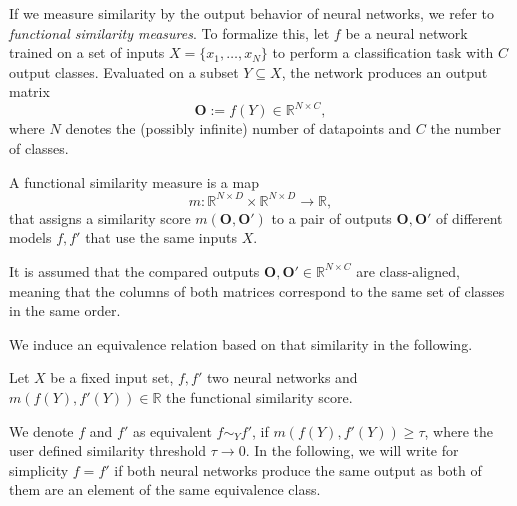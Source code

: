 If we measure similarity by the output behavior of neural networks, we refer to \emph{functional similarity measures}.
To formalize this, let \( f \) be a neural network trained on a set of inputs \( X = \{x_1, \ldots, x_N\} \) to perform a classification task with \( C \) output classes.
Evaluated on a subset \( Y \subseteq X \), the network produces an output matrix
\[
    \mathbf{O} := f(Y) \in \mathbb{R}^{N \times C},
\]
where \( N \) denotes the (possibly infinite) number of datapoints and \( C \) the number of classes.


\begin{definition}
A functional similarity measure is a map 
\begin{equation*}
    m: \mathbb{R}^{N\times D} \times \mathbb{R}^{N\times D} \longrightarrow \mathbb{R}, 
\end{equation*}
that assigns a similarity score $m(\mathbf{O}, \mathbf{O}')$ to a pair of outputs $\mathbf{O}, \mathbf{O}'$ of different models $f,f'$ that use the same inputs $X$. 

It is assumed that the compared outputs \( \mathbf{O}, \mathbf{O}' \in \mathbb{R}^{N \times C} \) are class-aligned, meaning that the columns of both matrices correspond to the same set of classes in the same order.
\end{definition}

We induce an equivalence relation based on that similarity in the following.

\begin{definition}
Let $X$ be a fixed input set, $f,f'$ two neural networks and $m(f(Y),f'(Y))\in \mathbb{R}$ the functional similarity score.

We denote $f$ and $f'$ as equivalent $f \sim_Y f'$, if $m(f(Y),f'(Y))\geq \tau$, where the user defined similarity threshold $\tau \to 0$.
In the following, we will write for simplicity $f=f'$ if both neural networks produce the same output as both of them are an element of the same equivalence class. 
    
\end{definition}